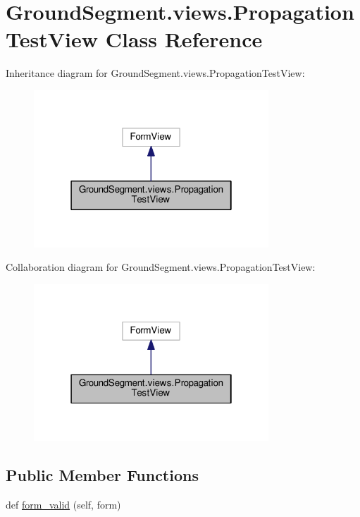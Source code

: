 \hypertarget{class_ground_segment_1_1views_1_1_propagation_test_view}{}\section{Ground\+Segment.\+views.\+Propagation\+Test\+View Class Reference}
\label{class_ground_segment_1_1views_1_1_propagation_test_view}


Inheritance diagram for Ground\+Segment.\+views.\+Propagation\+Test\+View\+:\nopagebreak
\begin{figure}[H]
\begin{center}
\leavevmode
\includegraphics[width=250pt]{class_ground_segment_1_1views_1_1_propagation_test_view__inherit__graph}
\end{center}
\end{figure}


Collaboration diagram for Ground\+Segment.\+views.\+Propagation\+Test\+View\+:\nopagebreak
\begin{figure}[H]
\begin{center}
\leavevmode
\includegraphics[width=250pt]{class_ground_segment_1_1views_1_1_propagation_test_view__coll__graph}
\end{center}
\end{figure}
\subsection*{Public Member Functions}
\begin{DoxyCompactItemize}
\item 
def \hyperlink{class_ground_segment_1_1views_1_1_propagation_test_view_a3664210be89ca335d45398f3c0b962e7}{form\+\_\+valid} (self, form)
\end{DoxyCompactItemize}
